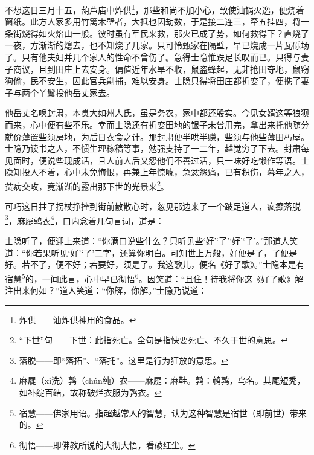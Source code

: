 \par 不想这日三月十五，葫芦庙中炸供\footnote{炸供——油炸供神用的食品。}，那些和尚不加小心，致使油锅火逸，便烧着窗纸。此方人家多用竹篱木壁者，大抵也因劫数，于是接二连三，牵五挂四，将一条街烧得如火焰山一般。彼时虽有军民来救，那火已成了势，如何救得下？直烧了一夜，方渐渐的熄去，也不知烧了几家。只可怜甄家在隔壁，早已烧成一片瓦砾场了。只有他夫妇并几个家人的性命不曾伤了。急得士隐惟跌足长叹而已。只得与妻子商议，且到田庄上去安身。偏值近年水旱不收，鼠盗蜂起，无非抢田夺地，鼠窃狗偷，民不安生，因此官兵剿捕，难以安身。士隐只得将田庄都折变了，便携了妻子与两个丫鬟投他岳丈家去。
\par 他岳丈名唤封肃，本贯大如州人氏，虽是务农，家中都还殷实。今见女婿这等狼狈而来，心中便有些不乐。幸而士隐还有折变田地的银子未曾用完，拿出来托他随分就价薄置些须房地，为后日衣食之计。那封肃便半哄半赚，些须与他些薄田朽屋。士隐乃读书之人，不惯生理稼穑等事，勉强支持了一二年，越觉穷了下去。封肃每见面时，便说些现成话，且人前人后又怨他们不善过活，只一味好吃懒作等语。士隐知投人不着，心中未免悔恨，再兼上年惊唬，急忿怨痛，已有积伤，暮年之人，贫病交攻，竟渐渐的露出那下世的光景来\footnote{“下世”句——下世：此指死亡。全句是指快要死亡、不久于世的意思。}。
\par 可巧这日拄了拐杖挣挫到街前散散心时，忽见那边来了一个跛足道人，疯癫落脱\footnote{落脱——即“落拓”、“落托”。这里是行为狂放的意思。}，麻屣鹑衣\footnote{麻屣（xǐ洗）鹑（chún纯）衣——麻屣：麻鞋。鹑：鹌鹑，鸟名。其尾短秃，如补绽百结，故称破烂衣服为鹑衣。}，口内念着几句言词，道是：
\par 士隐听了，便迎上来道：“你满口说些什么？只听见些‘好’‘了’‘好’‘了’。”那道人笑道：“你若果听见‘好’‘了’二字，还算你明白。可知世上万般，好便是了，了便是好。若不了，便不好；若要好，须是了。我这歌儿，便名《好了歌》。”士隐本是有宿慧\footnote{宿慧——佛家用语。指超越常人的智慧，认为这种智慧是宿世（即前世）带来的。}的，一闻此言，心中早已彻悟\footnote{彻悟——即佛教所说的大彻大悟，看破红尘。}。因笑道：“且住！待我将你这《好了歌》解注出来何如？”道人笑道：“你解，你解。”士隐乃说道：
